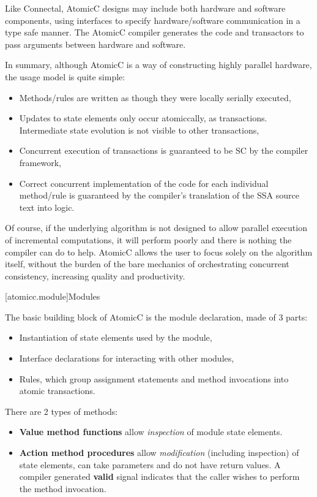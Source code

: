 Like Connectal\cite{king2015software}, AtomicC designs may include both hardware and
software components, using interfaces to specify hardware/software communication
in a type safe manner. The AtomicC compiler generates the code and transactors to pass
arguments between hardware and software.

In summary, although AtomicC is a way of constructing highly parallel hardware,
the usage model is quite simple:
\begin{itemize}
\item Methods/rules are written as though they were locally serially executed,
\item Updates to state elements only occur atomiccally, as transactions.
Intermediate state evolution is not visible to other transactions,
\item Concurrent execution of transactions is guaranteed to be SC by the compiler framework,
\item Correct concurrent implementation of the code for each individual method/rule
is guaranteed by the compiler's
translation of the SSA source text into logic.
\end{itemize}
Of course, if the underlying algorithm is not designed to allow parallel
execution of incremental computations, it will perform poorly and there
is nothing the compiler can do to help.  AtomicC allows
the user to focus solely on the algorithm itself,
without the burden of the bare mechanics of orchestrating concurrent consistency,
increasing quality and productivity.

[atomicc.module]{Modules}

The basic building block of AtomicC is the module declaration, made of 3 parts:
\begin{itemize}
\item Instantiation of state elements used by the module,
\item Interface declarations for interacting with other modules,
\item Rules, which group assignment statements and method invocations into atomic transactions.
\end{itemize}

There are 2 types of methods:
\begin{itemize}
\item \textbf{Value method functions} allow \textit{inspection} of module state elements.
\item \textbf{Action method procedures} allow \textit{modification}
(including inspection) of state elements,
can take parameters and do not have return values.
A compiler generated
\textbf{valid} signal indicates that the caller wishes to perform the method invocation.
\end{itemize}

